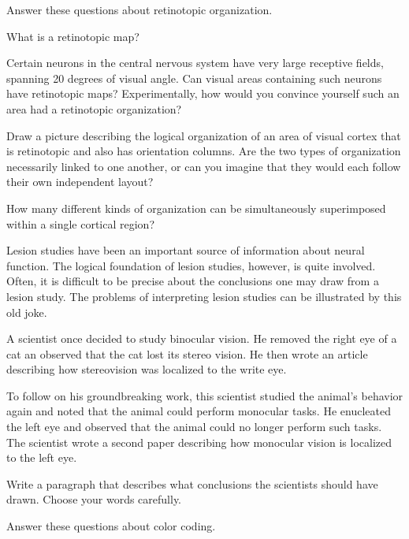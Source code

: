 \item Answer these questions about retinotopic organization.

 \be

 \item What is a retinotopic map?

 \item Certain neurons in the central nervous
system have very large receptive fields, 
spanning 20 degrees of visual angle.
Can visual areas containing such neurons have retinotopic maps?
Experimentally, how would you convince yourself
such an area had a retinotopic organization?

 \item Draw a picture describing the logical organization
of an area of visual cortex that is retinotopic and also
has orientation columns.
Are the two types of organization necessarily linked
to one another, or can you imagine that they would
each follow their own independent layout?

 \item How many different kinds of organization can be
simultaneously superimposed within a single cortical region?

 \ee

\item Lesion studies have been an important source of information
about neural function.
The logical foundation of lesion studies, however, is quite
involved.
Often, it is difficult to be precise about the conclusions
one may draw from a lesion study.
The problems of interpreting lesion studies can be
illustrated by this old joke.

A scientist once decided to study binocular vision.
He removed the right eye of a cat an observed that
the cat lost its stereo vision.
He then wrote an article describing how stereovision
was localized to the write eye.

To follow on his groundbreaking work, this scientist
studied the animal's behavior again and noted that
the animal could perform monocular tasks.
He enucleated the left eye and observed that the animal
could no longer perform such tasks.
The scientist wrote a second paper describing how monocular vision
is localized to the left eye.

Write a paragraph that describes what conclusions the
scientists should have drawn.
Choose your words carefully.

\item Answer these questions about color coding.

